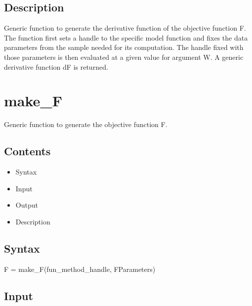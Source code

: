 \documentclass[a4paper,11pt,openany]{memoir}
\begin{document}
\subsection*{Description}

\begin{par}
Generic function to generate the derivative function of the objective function F. The function first sets a handle to the specific model function and fixes the data parameters from the sample needed for its computation. The handle fixed with those parameters is then evaluated at a given value for argument W. A generic derivative function dF is returned.
\end{par} \vspace{1em}

\newpage

\rmfamily
\color{black}\section{make\_F}

\begin{par}
Generic function to generate the objective function F.
\end{par} \vspace{1em}

\subsection*{Contents}

\begin{itemize}
\setlength{\itemsep}{-1ex}
   \item Syntax
   \item Input
   \item Output
   \item Description
\end{itemize}


\subsection*{Syntax}

\begin{par}
F = make\_F(fun\_method\_handle, FParameters)
\end{par} \vspace{1em}


\subsection*{Input}
\end{document}

